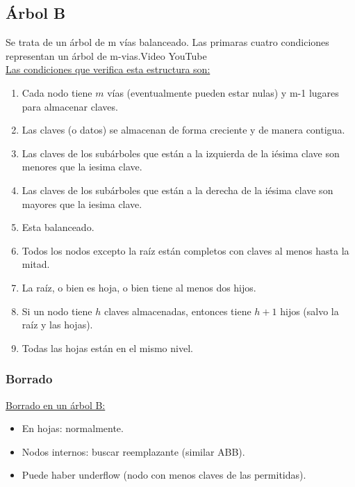 \documentclass[../main.tex]{subfiles}
\begin{document}
    \subsection{Árbol B}
        Se trata de un árbol de m vías balanceado. Las primaras cuatro condiciones representan un árbol de m-vias.Video YouTube \cite{Árboles-B_youtube}\\

        \underline{Las condiciones que verifica esta estructura son:}
        \begin{enumerate}
            \item Cada nodo tiene $m$ vías (eventualmente pueden estar nulas) y m-1 lugares para almacenar claves.
            \item Las claves (o datos) se almacenan de forma creciente y de manera contigua.
            \item Las claves de los subárboles que están a la izquierda de la iésima clave son menores que la iesima clave.
            \item Las claves de los subárboles que están a la derecha de la iésima clave son mayores que la iesima clave.
            \item Esta balanceado.
            \item Todos los nodos excepto la raíz están completos con claves al menos hasta la mitad.
            \item La raíz, o bien es hoja, o bien tiene al menos dos hijos.
            \item Si un nodo tiene $h$ claves almacenadas, entonces tiene $h+1$ hijos (salvo la raíz y las hojas).
            \item Todas las hojas están en el mismo nivel.
        \end{enumerate}

        \subsubsection{Borrado}
            \underline{Borrado en un árbol B:}
            \begin{itemize}
                \item En hojas: normalmente.
                \item Nodos internos: buscar reemplazante (similar ABB).
                \item Puede haber underflow (nodo con menos claves de las permitidas).
            \end{itemize}
\end{document}
